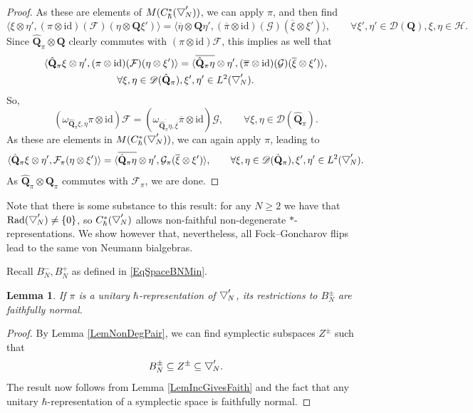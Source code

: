 \documentclass[11pt, reqno]{amsart}
\newtheorem{lemma}[theorem]{Lemma}
\theoremstyle{definition}
\numberwithin{equation}{section}
\def\msD{\mathscr D}
\def\Hc{\mathcal H}
\newcommand{\Qb}{\mathbf{Q}}
\newcommand{\Fct}{\mathcal{F}}
\newcommand{\tFct}{\mathcal{G}}
\newcommand{\Bor}{B}
\newcommand{\id}{\mathrm{id}}
\newcommand{\wbtd}[1]{\raisebox{\depth}{$\bigtriangledown'$\!\!}_{#1}}
\newcommand{\wwbtd}[1]{\Bor^-_{#1}}
\newcommand{\Rad}{\mathrm{Rad}}
\begin{document}
\begin{proof}
As these are elements of $M(C^*_{\hbar}(\wbtd{N}))$, we can apply $\pi$, and then find 
\[
\langle \xi\otimes \eta',(\pi\otimes \id)(\Fct)(\eta\otimes \Qb\xi')\rangle = \langle \overline{\eta}\otimes \Qb\eta',(\overline{\pi}\otimes \id)(\tFct)(\overline{\xi} \otimes \xi')\rangle,\qquad \forall \xi',\eta'\in \msD(\Qb),\xi,\eta\in \Hc.
\]
Since $\hat{\Qb}_{\pi}\otimes \Qb$ clearly commutes with $(\pi\otimes \id)\Fct$, this implies as well that
\begin{multline*}
\langle \hat{\Qb}_{\pi}\xi\otimes \eta',(\pi\otimes\id)(\Fct)(\eta\otimes \xi')\rangle = \langle \overline{\hat{\Qb}_{\pi}\eta}\otimes \eta',(\overline{\pi}\otimes \id)(\tFct)(\overline{\xi} \otimes \xi')\rangle,\\\forall \xi,\eta\in \msD(\hat{\Qb}_{\pi}),\xi',\eta'\in L^2(\wbtd{N}).
\end{multline*}
So,
\[
(\omega_{\hat{\Qb}_{\pi}\xi,\eta}\pi\otimes \id)\Fct = (\omega_{\overline{\hat{\Qb}_{\pi}\eta},\overline{\xi}}\overline{\pi}\otimes \id)\tFct,\qquad \forall \xi,\eta\in \msD(\hat{\Qb}_{\pi}).
\]
As these are elements in $M(C^*_{\hbar}(\wbtd{N}))$, we can again apply $\pi$, leading to 
\[
\langle \hat{\Qb}_{\pi}\xi\otimes \eta',\Fct_{\pi}(\eta\otimes \xi')\rangle = \langle \overline{\hat{\Qb}_{\pi}\eta}\otimes \eta',\tFct_{\pi}(\overline{\xi} \otimes \xi')\rangle,\qquad \forall \xi,\eta\in \msD(\hat{\Qb}_{\pi}),\xi',\eta'\in L^2(\wbtd{N}).
\]
As $\hat{\Qb}_{\pi}\otimes \Qb_{\pi}$ commutes with $\Fct_{\pi}$, we are done. 
\end{proof}
Note that there is some substance to this result: for any $N\geq 2$ we have that $\Rad(\wbtd{N})\neq \{0\}$, so $C^*_{\hbar}(\wbtd{N})$ allows non-faithful non-degenerate $*$-representations. We show however that, nevertheless, all Fock--Goncharov flips lead to the same von Neumann bialgebras.


Recall $\wwbtd{N},\Bor_N^+$ as defined in \eqref{EqSpaceBNMin}.


\begin{lemma}\label{LemResFaith}
If $\pi$ is a unitary $\hbar$-representation of $\wbtd{N}$, its restrictions to $\Bor_{N}^{\pm}$ are faithfully normal. 
\end{lemma}
\begin{proof}
By Lemma \ref{LemNonDegPair}, we can find symplectic subspaces $Z^{\pm}$ such that 
\[
\Bor_N^{\pm} \subseteq Z^{\pm} \subseteq \wbtd{N}.
\]
The result now follows from Lemma \ref{LemIncGivesFaith} and the fact that any unitary $\hbar$-representation of a symplectic space is faithfully normal.
\end{proof}
\end{document}
